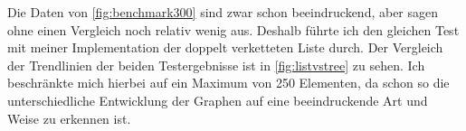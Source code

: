 \par
Die Daten von \autoref{fig:benchmark300} sind zwar schon beeindruckend, aber sagen ohne einen Vergleich noch relativ wenig aus. Deshalb führte ich den gleichen Test mit meiner Implementation der doppelt verketteten Liste durch. Der Vergleich der Trendlinien der beiden Testergebnisse ist in \autoref{fig:listvstree} zu sehen. Ich beschränkte mich hierbei auf ein Maximum von 250 Elementen, da schon so die unterschiedliche Entwicklung der Graphen auf eine beeindruckende Art und Weise zu erkennen ist.

\begin{figure}
\end{figure}
